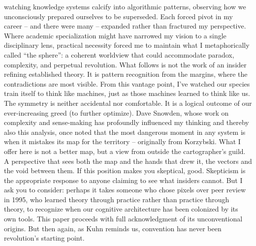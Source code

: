 watching knowledge systems calcify into algorithmic patterns,
observing how we unconsciously prepared ourselves to be superseded.
Each forced pivot in my career – and there were many – expanded rather than fractured my perspective.
Where academic specialization might have narrowed my vision to a single disciplinary lens,
practical necessity forced me to maintain what I metaphorically called ``the sphere'': a coherent worldview that
could accommodate paradox, complexity, and perpetual revolution.
What follows is not the work of an insider refining established theory.
It is pattern recognition from the margins, where the contradictions are most visible.
From this vantage point, I've watched our species train itself to think like machines,
just as those machines learned to think like us. The symmetry is neither accidental nor comfortable. It is a logical outcome
of our ever-increasing greed (to further optimize).
Dave Snowden, whose work on complexity and sense-making has profoundly influenced my thinking and
thereby also this analysis, once noted that the most dangerous moment in any system is when it mistakes
its map for the territory – originally from Korzybski. What I offer here is not a better map,
but a view from outside the cartographer's guild.
A perspective that sees both the map and the hands that drew it, the vectors and the void between them.
If this position makes you skeptical, good. Skepticism is the appropriate response to anyone claiming to see what insiders cannot.
But I ask you to consider: perhaps it takes someone who chose pixels over peer review in 1995,
who learned theory through practice rather than practice through theory,
to recognize when our cognitive architecture has been colonized by its own tools.
This paper proceeds with full acknowledgment of its unconventional origins.
But then again, as Kuhn \citep{kuhn1962} reminds us, convention has never been revolution's starting point.
